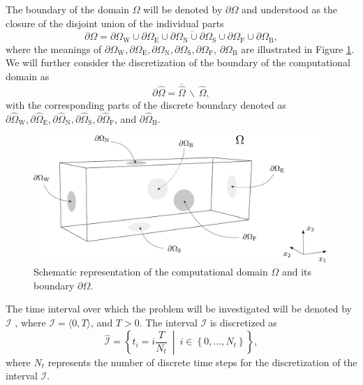 The boundary of the domain $ \Omega $ will be denoted by $ \partial \Omega $ and understood as the closure of the disjoint union of the individual parts 
\begin{equation}\label{eq:border decomposition}
	\partial \Omega = \overline{\partial \Omega_{\mathrm{W}} \cup \partial \Omega_{\mathrm{E}} \cup \partial \Omega_{\mathrm{N}} \cup \partial \Omega_{\mathrm{S}} \cup \partial \Omega_{\mathrm{F}} \cup \partial \Omega_{\mathrm{B}}},
\end{equation}
where the meanings of $\partial \Omega_{\mathrm{W}} , \partial \Omega_{\mathrm{E}} , \partial \Omega_{\mathrm{N}}, \partial \Omega_{\mathrm{S}}, \partial \Omega_{\mathrm{F}}$, $  \partial \Omega_{\mathrm{B}} $ are illustrated in Figure \ref{fig:domain}. We will further consider the discretization of the boundary of the computational domain as
\begin{equation}\label{eq:border}
	\partial\hat{\Omega} = \overline{\hat{\Omega}} \, \backslash \, \hat{\Omega},
\end{equation}
with the corresponding parts of the discrete boundary denoted as $ \partial \hat{\Omega}_{\mathrm{W}} , \partial \hat{\Omega}_{\mathrm{E}} , \partial \hat{\Omega}_{\mathrm{N}}, \partial \hat{\Omega}_{\mathrm{S}}, \partial \hat{\Omega}_{\mathrm{F}}$,  and $ \partial \hat{\Omega}_{\mathrm{B}} $.
\begin{figure}[H]
	\centering
	\includegraphics[width=0.99\textwidth]{figures/omega.pdf}
	\caption{Schematic representation of the computational domain $ \Omega $ and its boundary $ \partial \Omega $.}  
	\label{fig:domain}
	\vspace{1.8mm}
\end{figure}

The time interval over which the problem will be investigated will be denoted by $ \mathcal{I} $ , where ${\mathcal{I} = \langle 0, T \rangle}$, and $ T > 0 $. The interval $ \mathcal{I} $ is discretized as
\begin{equation}\label{eq:timediscrete}
	\hat{\mathcal{I}} = \left\{ t_{i} = i \frac{T}{N_t} \ \middle| \ i \in \left\{0, \dots, N_{t} \right\} \right\},
\end{equation}
where $ N_t $ represents the number of discrete time steps for the discretization of the interval $ \mathcal{I} $.

